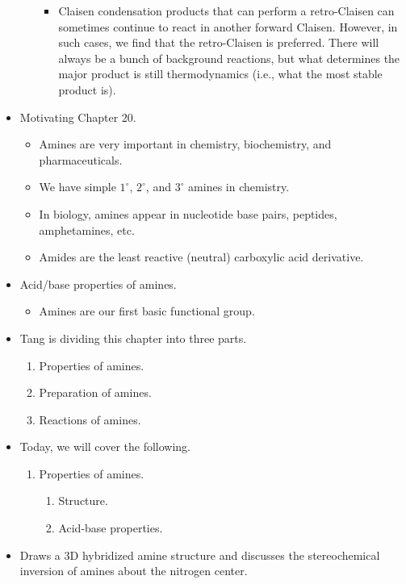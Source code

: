\documentclass[../notes.tex]{subfiles}
\begin{document}
\begin{itemize}
\begin{itemize}
\begin{itemize}
            \item Claisen condensation products that can perform a retro-Claisen can sometimes continue to react in another forward Claisen. However, in such cases, we find that the retro-Claisen is preferred. There will always be a bunch of background reactions, but what determines the major product is still thermodynamics (i.e., what the most stable product is).
        \end{itemize}
    \end{itemize}
    \item Motivating Chapter 20.
    \begin{itemize}
        \item Amines are very important in chemistry, biochemistry, and pharmaceuticals.
        \item We have simple $1^\circ$, $2^\circ$, and $3^\circ$ amines in chemistry.
        \item In biology, amines appear in nucleotide base pairs, peptides, amphetamines, etc.
        \item Amides are the least reactive (neutral) carboxylic acid derivative.
    \end{itemize}
    \item Acid/base properties of amines.
    \begin{itemize}
        \item Amines are our first basic functional group.
    \end{itemize}
    \item Tang is dividing this chapter into three parts.
    \begin{enumerate}[label={\Roman*.}]
        \item Properties of amines.
        \item Preparation of amines.
        \item Reactions of amines.
    \end{enumerate}
    \item Today, we will cover the following.
    \begin{enumerate}[label={\Roman*.}]
        \item Properties of amines.
        \begin{enumerate}[label={\Alph*.}]
            \item Structure.
            \item Acid-base properties.
        \end{enumerate}
    \end{enumerate}
    \item Draws a 3D hybridized amine structure and discusses the stereochemical inversion of amines about the nitrogen center.

\end{itemize}
\end{document}
